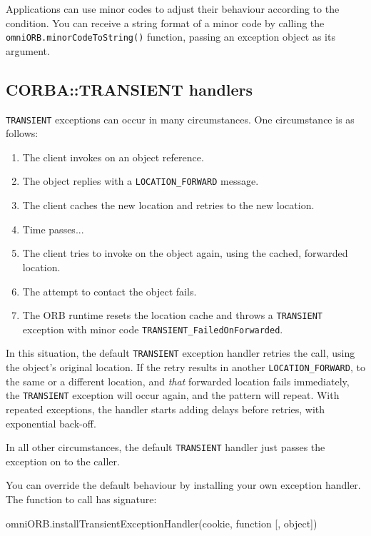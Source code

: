 \documentclass[11pt,twoside,a4paper]{book}
\newcommand{\code}[1]{\texttt{#1}}
\newcommand{\op}[1]{\texttt{#1()}}
\newcommand{\dsc}{\discretionary{}{}{}}
\begin{document}
Applications can use minor codes to adjust their behaviour according
to the condition. You can receive a string format of a minor code by
calling the \op{omniORB.\dsc{}minorCodeToString} function, passing an
exception object as its argument.



\subsection{CORBA::TRANSIENT handlers}

\code{TRANSIENT} exceptions can occur in many circumstances. One
circumstance is as follows:

\begin{enumerate}

\item The client invokes on an object reference.
\item The object replies with a \code{LOCATION\_FORWARD} message.
\item The client caches the new location and retries to the new location.
\item Time passes...
\item The client tries to invoke on the object again, using the
      cached, forwarded location. 
\item The attempt to contact the object fails.
\item The ORB runtime resets the location cache and throws a
      \code{TRANSIENT} exception with minor code
      \code{TRANSIENT\_FailedOnForwarded}.

\end{enumerate}

In this situation, the default \code{TRANSIENT} exception handler
retries the call, using the object's original location. If the retry
results in another \code{LOCATION\_FORWARD}, to the same or a
different location, and \emph{that} forwarded location fails
immediately, the \code{TRANSIENT} exception will occur again, and the
pattern will repeat. With repeated exceptions, the handler starts
adding delays before retries, with exponential back-off.

In all other circumstances, the default \code{TRANSIENT} handler just
passes the exception on to the caller.

You can override the default behaviour by installing your own
exception handler. The function to call has signature:

\begin{pylisting}
omniORB.installTransientExceptionHandler(cookie, function [, object])
\end{pylisting}
\end{document}
